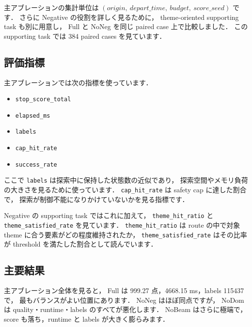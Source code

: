 \documentclass[a4paper,11pt]{article}
\begin{document}
主アブレーションの集計単位は
\((origin,\ depart\_time,\ budget,\ score\_seed)\)
です．
さらに Negative の役割を詳しく見るために，
theme-oriented supporting task も別に用意し，
Full と NoNeg を同じ paired case 上で比較しました．
この supporting task では 384 paired cases を見ています．

\subsection*{評価指標}
主アブレーションでは次の指標を使っています．
\begin{itemize}
    \item \texttt{stop\_score\_total}
    \item \texttt{elapsed\_ms}
    \item \texttt{labels}
    \item \texttt{cap\_hit\_rate}
    \item \texttt{success\_rate}
\end{itemize}

ここで \texttt{labels} は探索中に保持した状態数の近似であり，
探索空間やメモリ負荷の大きさを見るために使っています．
\texttt{cap\_hit\_rate} は safety cap に達した割合で，
探索が制御不能になりかけていないかを見る指標です．

Negative の supporting task ではこれに加えて，
\texttt{theme\_hit\_ratio} と
\texttt{theme\_satisfied\_rate} を見ています．
\texttt{theme\_hit\_ratio} は route の中で対象 theme に合う要素がどの程度維持されたか，
\texttt{theme\_satisfied\_rate} はその比率が threshold を満たした割合として読んでいます．

\subsection*{主要結果}
主アブレーション全体を見ると，
Full は 999.27 点，4668.15 ms，labels 115437 で，
最もバランスがよい位置にあります．
NoNeg はほぼ同点ですが，
NoDom は quality・runtime・labels のすべてが悪化します．
NoBeam はさらに極端で，
score も落ち，runtime と labels が大きく膨らみます．
\end{document}
